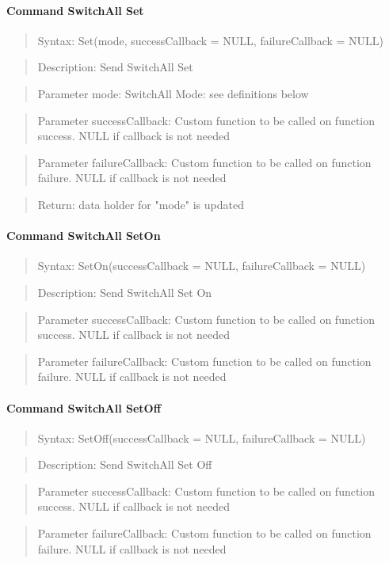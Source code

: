 \paragraph {Command SwitchAll Set}
\begin{quote} Syntax: Set(mode, successCallback = NULL, failureCallback = NULL)\end{quote}
\begin{quote} Description: Send SwitchAll Set\end{quote}
\begin{quote} Parameter mode: SwitchAll Mode: see definitions below\end{quote}
\begin{quote} Parameter successCallback: Custom function to be called on function success. NULL if callback is not needed\end{quote}
\begin{quote} Parameter failureCallback: Custom function to be called on function failure. NULL if callback is not needed\end{quote}
\begin{quote} Return: data holder for "mode"  is updated\end{quote}

\paragraph {Command SwitchAll SetOn}
\begin{quote} Syntax: SetOn(successCallback = NULL, failureCallback = NULL)\end{quote}
\begin{quote} Description: Send SwitchAll Set On\end{quote}
\begin{quote} Parameter successCallback: Custom function to be called on function success. NULL if callback is not needed\end{quote}
\begin{quote} Parameter failureCallback: Custom function to be called on function failure. NULL if callback is not needed\end{quote}

\paragraph {Command SwitchAll SetOff}
\begin{quote} Syntax: SetOff(successCallback = NULL, failureCallback = NULL)\end{quote}
\begin{quote} Description: Send SwitchAll Set Off\end{quote}
\begin{quote} Parameter successCallback: Custom function to be called on function success. NULL if callback is not needed\end{quote}
\begin{quote} Parameter failureCallback: Custom function to be called on function failure. NULL if callback is not needed\end{quote}


